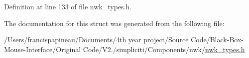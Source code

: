 \-Definition at line 133 of file nwk\-\_\-types.\-h.



\-The documentation for this struct was generated from the following file\-:\begin{DoxyCompactItemize}
\item 
/\-Users/francispapineau/\-Documents/4th year project/\-Source Code/\-Black-\/\-Box-\/\-Mouse-\/\-Interface/\-Original Code/\-V2./simpliciti/\-Components/nwk/\hyperlink{nwk__types_8h}{nwk\-\_\-types.\-h}\end{DoxyCompactItemize}

